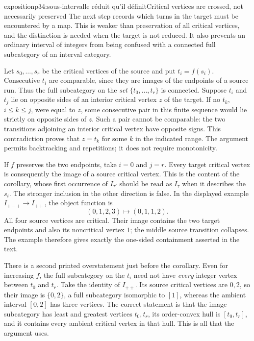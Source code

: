 \begin{dcomment}{exposition}{p34:sous-intervalle réduit qu'il définit}{Critical vertices are crossed, not necessarily preserved}
The next step records which turns in the target must be encountered by a map. This is weaker than preservation of all critical vertices, and the distinction is needed when the target is not reduced. It also prevents an ordinary interval of integers from being confused with a connected full subcategory of an interval category.

Let $s_0,\ldots,s_r$ be the critical vertices of the source and put $t_i=f(s_i)$. Consecutive $t_i$ are comparable, since they are images of the endpoints of a source run. Thus the full subcategory on the \emph{set} $\{t_0,\ldots,t_r\}$ is connected. Suppose $t_i$ and $t_j$ lie on opposite sides of an interior critical vertex $z$ of the target. If no $t_k$, $i\leq k\leq j$, were equal to $z$, some consecutive pair in this finite sequence would lie strictly on opposite sides of $z$. Such a pair cannot be comparable: the two transitions adjoining an interior critical vertex have opposite signs. This contradiction proves that $z=t_k$ for some $k$ in the indicated range. The argument permits backtracking and repetitions; it does not require monotonicity.

If $f$ preserves the two endpoints, take $i=0$ and $j=r$. Every target critical vertex is consequently the image of a source critical vertex. This is the content of the corollary, whose first occurrence of $I_{\tau'}$ should be read as $I_\tau$ when it describes the $s_i$. The stronger inclusion in the other direction is false. In the displayed example $I_{+-+}\to I_{++}$, the object function is
\[
 (0,1,2,3)\longmapsto(0,1,1,2).
\]
All four source vertices are critical. Their image contains the two target endpoints and also its noncritical vertex $1$; the middle source transition collapses. The example therefore gives exactly the one-sided containment asserted in the text.

There is a second printed overstatement just before the corollary. Even for increasing $f$, the full subcategory on the $t_i$ need not have \emph{every} integer vertex between $t_0$ and $t_r$. Take the identity of $I_{++}$. Its source critical vertices are $0,2$, so their image is $\{0,2\}$, a full subcategory isomorphic to $[1]$, whereas the ambient interval $[0,2]$ has three vertices. The correct statement is that the image subcategory has least and greatest vertices $t_0,t_r$, its order-convex hull is $[t_0,t_r]$, and it contains every ambient critical vertex in that hull. This is all that the argument uses.


\end{dcomment}
